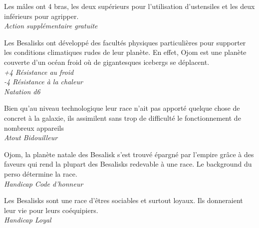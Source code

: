 \begin{description}[align=left]
\item [A bras le corps]         %
    Les mâles ont 4 bras, les deux supérieurs pour l’utilisation d’ustensiles et les deux inférieurs pour agripper.\\
    \textit{Action supplémentaire gratuite}

\item [Pas frileux]             %
    Les Besalisks ont développé des facultés physiques particulières pour supporter les conditions climatiques rudes de leur planète. En effet, Ojom est une planète couverte d’un océan froid où de gigantesques icebergs se déplacent.\\
    \textit{+4 Résistance au froid}\\
    \textit{-4 Résistance à la chaleur}\\
    \textit{Natation d6}

\item [Bricoleur]               %
    Bien qu’au niveau technologique leur race n’ait pas apporté quelque chose de concret à la galaxie, ils assimilent sans trop de difficulté le fonctionnement de nombreux appareils\\
    \textit{Atout Bidouilleur}

\item [Dette de Liberté]        %
    Ojom, la planète natale des Besalisk s’est trouvé épargné par l’empire grâce à des faveurs qui rend la plupart des Besalisks redevable à une race. Le background du perso détermine la race.\\
    \textit{Handicap Code d’honneur}

\item [Loyal]                   %
    Les Besalisks sont une race d’êtres sociables et surtout loyaux. Ils donneraient leur vie pour leurs coéquipiers.\\
    \textit{Handicap Loyal}
\end{description}